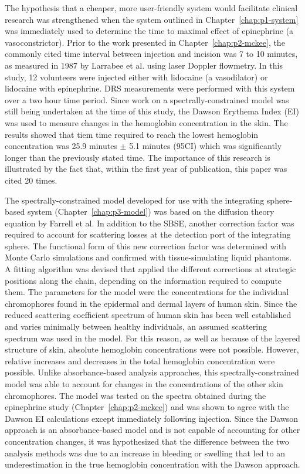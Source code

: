 The hypothesis that a cheaper, more user-friendly system would facilitate clinical research was strengthened when the system outlined in Chapter~\ref{chap:p1-system} was immediately used to determine the time to maximal effect of epinephrine (a vasoconstrictor). Prior to the work presented in Chapter~\ref{chap:p2-mckee}, the commonly cited time interval between injection and incision was 7 to 10 minutes, as measured in 1987 by Larrabee et al.\cite{Larrabee1987} using laser Doppler flowmetry. In this study, 12 volunteers were injected either with lidocaine (a vasodilator) or lidocaine with epinephrine. DRS measurements were performed with this system over a two hour time period. Since work on a spectrally-constrained model was still being undertaken at the time of this study, the Dawson Erythema Index (EI)\cite{Dawson1980} was used to measure changes in the hemoglobin concentration in the skin. The results showed that tiem time required to reach the lowest hemoglobin concentration was 25.9 minutes $\pm$ 5.1 minutes (95CI) which was significantly longer than the previously stated time. The importance of this research is illustrated by the fact that, within the first year of publication, this paper was cited 20 times.

The spectrally-constrained model developed for use with the integrating sphere-based system (Chapter~\ref{chap:p3-model}) was based on the diffusion theory equation by Farrell et al.\cite{Farrell1992} In addition to the SBSE, another correction factor was required to account for scattering losses at the detection port of the integrating sphere. The functional form of this new correction factor was determined with Monte Carlo simulations and confirmed with tissue-simulating liquid phantoms. A fitting algorithm was devised that applied the different corrections at strategic positions along the chain, depending on the information required to compute them. The parameters for the model were the concentrations for the individual chromophores found in the epidermal and dermal layers of human skin. Since the reduced scattering coefficient spectrum of human skin has been well established and varies minimally between healthy individuals, an assumed scattering spectrum was used in the model. For this reason, as well as because of the layered structure of skin, absolute hemoglobin concentrations were not possible. However, relative increases and decreases in the total hemoglobin concentration were possible. Unlike absorbance-based analysis approaches, this spectrally-constrained model was able to account for changes in the concentrations of the other skin chromophores. The model was tested on the spectra obtained during the epinephrine study (Chapter~\ref{chap:p2-mckee}) and was shown to agree with the Dawson EI calculations except immediately following injection. Since the Dawson approach is an absorbance-based model and is not capable of accounting for other concentration changes, it was hypothesized that the difference between the two analysis methods was due to an increase in bleeding or swelling that led to an underestimation in the true hemoglobin concentration with the Dawson approach. 

